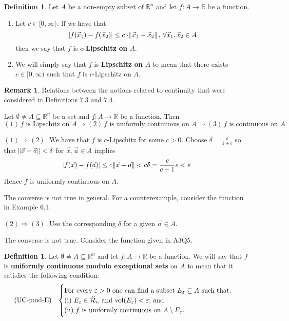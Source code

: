 \documentclass[11pt]{article}
\theoremstyle{definition}
\newtheorem{defn}[thm]{Definition}
\newtheorem{remark}[thm]{Remark}
\newcommand{\R}{\ensuremath{\mathbb{R}}}
\begin{document}
\begin{defn}
Let $A$ be a non-empty subset of $\R^n$ and let $f : A \to \R$ be a function. \vspace{-1.5ex}
\begin{enumerate}[(1)]
\item Let $c \in [0, \infty)$. If we have that
$$|f(\vec{x}_1) - f(\vec{x}_2)| \leq c \cdot \norm{\vec{x}_1 - \vec{x}_2}, \, \forall \vec{x}_1, \vec{x}_2 \in A$$
then we say that $f$ is {\bf $c$-Lipschitz on $A$}.
\item We will simply say that $f$ is {\bf Lipschitz on $A$} to mean that there exists $c \in [0, \infty)$ such that $f$ is $c$-Lipschitz on $A$.
\end{enumerate}
\end{defn}

\begin{remark} 
Relations between the notions related to continuity that were considered in Definitions 7.3 and 7.4.

Let $\emptyset \ne A \subseteq \R^n$ be a set and $f : A \to \R$ be a function. Then 
$$(1) \,f \text{ is Lipschitz on } A \Rightarrow (2) \,f \text{ is uniformly continuous on } A \Rightarrow (3) \,f \text{ is continuous on } A$$

$(1) \Rightarrow (2)$. We have that $f$ is $c$-Lipschitz for some $c > 0$. Choose $\delta = \frac{\varepsilon}{1+c}$ so that $\norm{\vec{x} - \vec{a}} < \delta$ for $\vec{x}, \vec{a} \in A$ implies
$$|f(\vec{x}) - f(\vec{a})| \leq c\norm{\vec{x} - \vec{a}} < c \delta = \frac{c}{c+1} \varepsilon < \varepsilon$$
Hence $f$ is uniformly continuous on $A$.

The converse is not true in general. For a counterexample, consider the function in Example 6.1.

$(2) \Rightarrow (3)$. Use the corresponding $\delta$ for a given $\vec{a} \in A$.

The converse is not true. Consider the function given in A3Q5.
\end{remark}

\begin{defn}
Let $\emptyset \neq A \subseteq \R^n$ and let $f : A \to \R$ be a function. We will say that $f$ is {\bf uniformly continuous modulo exceptional sets} on $A$ to mean that it satisfies the following condition:
$$ \text{(UC-mod-E)} \;\;\; \begin{cases} \text{For every $\varepsilon > 0$ one can find a subset $E_\varepsilon \subseteq A$ such that:} \\
\text{(i) $E_\varepsilon \in \widehat{\mathcal{R}}_n$ and ${\rm vol}(E_\varepsilon) < \varepsilon$; and} \\
\text{(ii) $f$ is uniformly continuous on $A \setminus E_\varepsilon$.}
\end{cases}$$
\end{defn}
\end{document}
